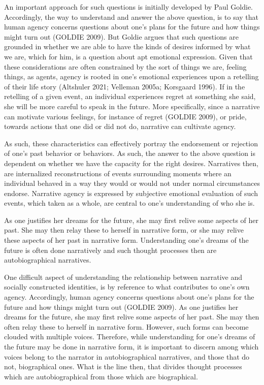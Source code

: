 \documentclass[
  letterpaper,
  DIV=11,
  numbers=noendperiod]{scrartcl}
\theoremstyle{remark}
\begin{document}
An important approach for such questions is initially developed by Paul
Goldie. Accordingly, the way to understand and answer the above
question, is to say that human agency concerns questions about one's
plans for the future and how things might turn out (GOLDIE 2009). But
Goldie argues that such questions are grounded in whether we are able to
have the kinds of desires informed by what we are, which for him, is a
question about apt emotional expression. Given that these considerations
are often constrained by the sort of things we are, feeling things, as
agents, agency is rooted in one's emotional experiences upon a retelling
of their life story (Altshuler 2021; Velleman 2005a; Korsgaard 1996). If
in the retelling of a given event, an individual experiences regret at
something she said, she will be more careful to speak in the future.
More specifically, since a narrative can motivate various feelings, for
instance of regret (GOLDIE 2009), or pride, towards actions that one did
or did not do, narrative can cultivate agency.

As such, these characteristics can effectively portray the endorsement
or rejection of one's past behavior or behaviors. As such, the answer to
the above question is dependent on whether we have the capacity for the
right desires. Narratives then, are internalized reconstructions of
events surrounding moments where an individual behaved in a way they
would or would not under normal circumstances endorse. Narrative agency
is expressed by subjective emotional evaluation of such events, which
taken as a whole, are central to one's understanding of who she is.

As one justifies her dreams for the future, she may first relive some
aspects of her past. She may then relay these to herself in narrative
form, or she may relive these aspects of her past in narrative form.
Understanding one's dreams of the future is often done narratively and
such thought processes then are autobiographical narratives.

One difficult aspect of understanding the relationship between narrative
and socially constructed identities, is by reference to what contributes
to one's own agency. Accordingly, human agency concerns questions about
one's plans for the future and how things might turn out (GOLDIE 2009).
As one justifies her dreams for the future, she may first relive some
aspects of her past. She may then often relay these to herself in
narrative form. However, such forms can become clouded with multiple
voices. Therefore, while understanding for one's dreams of the future
may be done in narrative form, it is important to discern among which
voices belong to the narrator in autobiographical narratives, and those
that do not, biographical ones. What is the line then, that divides
thought processes which are autobiographical from those which are
biographical.
\end{document}
